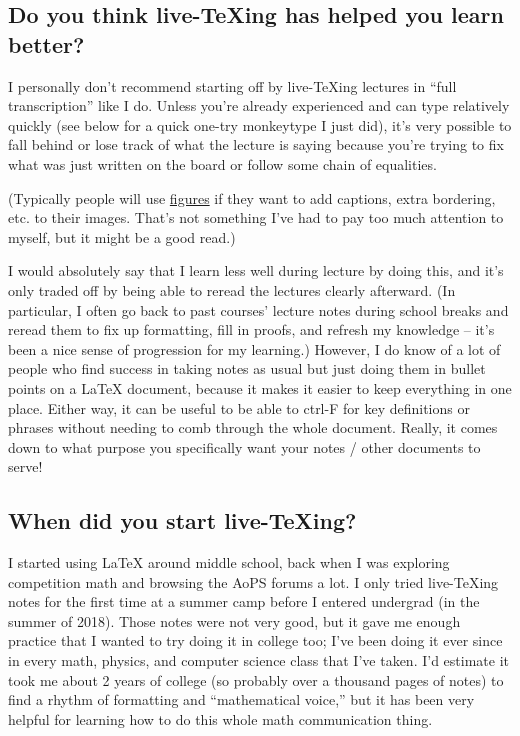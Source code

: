 \documentclass[11pt]{article}
\begin{document}
\subsection*{Do you think live-TeXing has helped you learn better?}
I personally don't recommend starting off by live-TeXing lectures in ``full transcription'' like I do. Unless you're already experienced and can type relatively quickly (see below for a quick one-try monkeytype I just did), it's very possible to fall behind or lose track of what the lecture is saying because you're trying to fix what was just written on the board or follow some chain of equalities. 


(Typically people will use \href{https://www.overleaf.com/learn/latex/Inserting_Images}{figures} if they want to add captions, extra bordering, etc. to their images. That's not something I've had to pay too much attention to myself, but it might be a good read.) 

I would absolutely say that I learn less well during lecture by doing this, and it's only traded off by being able to reread the lectures clearly afterward. (In particular, I often go back to past courses' lecture notes during school breaks and reread them to fix up formatting, fill in proofs, and refresh my knowledge -- it's been a nice sense of progression for my learning.) However, I do know of a lot of people who find success in taking notes as usual but just doing them in bullet points on a LaTeX document, because it makes it easier to keep everything in one place. Either way, it can be useful to be able to ctrl-F for key definitions or phrases without needing to comb through the whole document. Really, it comes down to what purpose you specifically want your notes / other documents to serve!

\subsection*{When did you start live-TeXing?}

I started using LaTeX around middle school, back when I was exploring competition math and browsing the AoPS forums a lot. I only tried live-TeXing notes for the first time at a summer camp before I entered undergrad (in the summer of 2018). Those notes were not very good, but it gave me enough practice that I wanted to try doing it in college too; I've been doing it ever since in every math, physics, and computer science class that I've taken. I'd estimate it took me about 2 years of college (so probably over a thousand pages of notes) to find a rhythm of formatting and ``mathematical voice,'' but it has been very helpful for learning how to do this whole math communication thing. 
\end{document}
